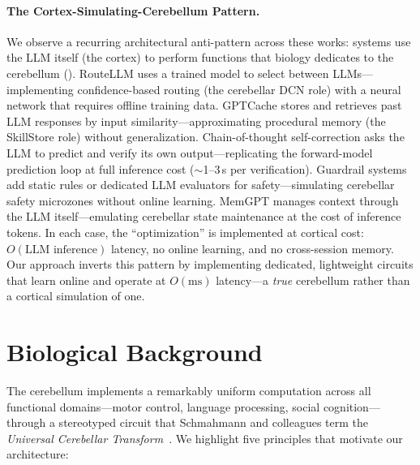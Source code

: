 \documentclass[11pt,a4paper]{article}
\begin{document}
\paragraph{The Cortex-Simulating-Cerebellum Pattern.}
We observe a recurring architectural anti-pattern across these works: systems use the LLM itself (the cortex) to perform functions that biology dedicates to the cerebellum ().
RouteLLM uses a trained model to select between LLMs---implementing confidence-based routing (the cerebellar DCN role) with a neural network that requires offline training data.
GPTCache stores and retrieves past LLM responses by input similarity---approximating procedural memory (the SkillStore role) without generalization.
Chain-of-thought self-correction asks the LLM to predict and verify its own output---replicating the forward-model prediction loop at full inference cost ($\sim$1--3\,s per verification).
Guardrail systems add static rules or dedicated LLM evaluators for safety---simulating cerebellar safety microzones without online learning.
MemGPT manages context through the LLM itself---emulating cerebellar state maintenance at the cost of inference tokens.
In each case, the ``optimization'' is implemented at cortical cost: $O(\text{LLM inference})$ latency, no online learning, and no cross-session memory.
Our approach inverts this pattern by implementing dedicated, lightweight circuits that learn online and operate at $O(\text{ms})$ latency---a \emph{true} cerebellum rather than a cortical simulation of one.

\section{Biological Background}\label{sec:biology}

The cerebellum implements a remarkably uniform computation across all functional domains---motor control, language processing, social cognition---through a stereotyped circuit that Schmahmann and colleagues term the \emph{Universal Cerebellar Transform}~\citep{schmahmann2019cerebellar,diedrichsen2019universal}.
We highlight five principles that motivate our architecture:
\end{document}
